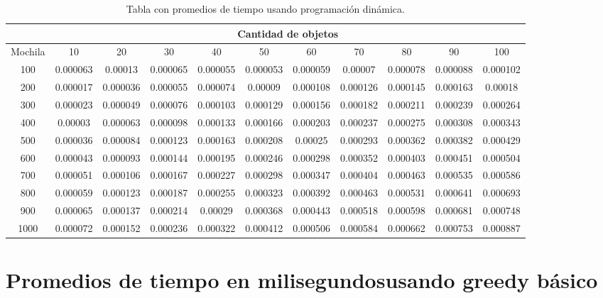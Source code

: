 \documentclass[a4paper]{article}
\begin{document}
\begin{table}[H]
\centering
\relax
\resizebox{\textwidth}{!} {%
\begin{tabular}{|c|c|c|c|c|c|c|c|c|c|c|}
\cline{2-11}
 \multicolumn{1}{c}{} & \multicolumn{10}{|c|}{\textbf{Cantidad de objetos}} \\
\hline
Mochila & 10 & 20 & 30 & 40 & 50 & 60 & 70 & 80 & 90 & 100 \\
\hline
\hline
100 & 0.000063 & 0.00013 & 0.000065 & 0.000055 & 0.000053 & 0.000059 & 0.00007 & 0.000078 & 0.000088 & 0.000102 \\
\hline
\hline
200 & 0.000017 & 0.000036 & 0.000055 & 0.000074 & 0.00009 & 0.000108 & 0.000126 & 0.000145 & 0.000163 & 0.00018 \\
\hline
\hline
300 & 0.000023 & 0.000049 & 0.000076 & 0.000103 & 0.000129 & 0.000156 & 0.000182 & 0.000211 & 0.000239 & 0.000264 \\
\hline
\hline
400 & 0.00003 & 0.000063 & 0.000098 & 0.000133 & 0.000166 & 0.000203 & 0.000237 & 0.000275 & 0.000308 & 0.000343 \\
\hline
\hline
500 & 0.000036 & 0.000084 & 0.000123 & 0.000163 & 0.000208 & 0.00025 & 0.000293 & 0.000362 & 0.000382 & 0.000429 \\
\hline
\hline
600 & 0.000043 & 0.000093 & 0.000144 & 0.000195 & 0.000246 & 0.000298 & 0.000352 & 0.000403 & 0.000451 & 0.000504 \\
\hline
\hline
700 & 0.000051 & 0.000106 & 0.000167 & 0.000227 & 0.000298 & 0.000347 & 0.000404 & 0.000463 & 0.000535 & 0.000586 \\
\hline
\hline
800 & 0.000059 & 0.000123 & 0.000187 & 0.000255 & 0.000323 & 0.000392 & 0.000463 & 0.000531 & 0.000641 & 0.000693 \\
\hline
\hline
900 & 0.000065 & 0.000137 & 0.000214 & 0.00029 & 0.000368 & 0.000443 & 0.000518 & 0.000598 & 0.000681 & 0.000748 \\
\hline
\hline
1000 & 0.000072 & 0.000152 & 0.000236 & 0.000322 & 0.000412 & 0.000506 & 0.000584 & 0.000662 & 0.000753 & 0.000887 \\
\hline
\end{tabular}%
}
\caption{Tabla con promedios de tiempo usando programación dinámica.}
\end{table}
\section{Promedios de tiempo en milisegundosusando greedy básico}
\end{document}
